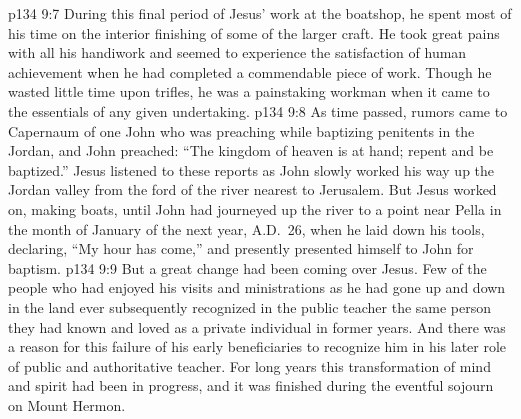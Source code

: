 \vs p134 9:7 During this final period of Jesus’ work at the boatshop, he spent most of his time on the interior finishing of some of the larger craft. He took great pains with all his handiwork and seemed to experience the satisfaction of human achievement when he had completed a commendable piece of work. Though he wasted little time upon trifles, he was a painstaking workman when it came to the essentials of any given undertaking.
\pc \vs p134 9:8 As time passed, rumors came to Capernaum of one John who was preaching while baptizing penitents in the Jordan, and John preached: “The kingdom of heaven is at hand; repent and be baptized.” Jesus listened to these reports as John slowly worked his way up the Jordan valley from the ford of the river nearest to Jerusalem. But Jesus worked on, making boats, until John had journeyed up the river to a point near Pella in the month of January of the next year, A.D.~26, when he laid down his tools, declaring, \textcolor{ubdarkred}{“My hour has come,”} and presently presented himself to John for baptism.
\vs p134 9:9 But a great change had been coming over Jesus. Few of the people who had enjoyed his visits and ministrations as he had gone up and down in the land ever subsequently recognized in the public teacher the same person they had known and loved as a private individual in former years. And there was a reason for this failure of his early beneficiaries to recognize him in his later role of public and authoritative teacher. For long years this transformation of mind and spirit had been in progress, and it was finished during the eventful sojourn on Mount Hermon.
